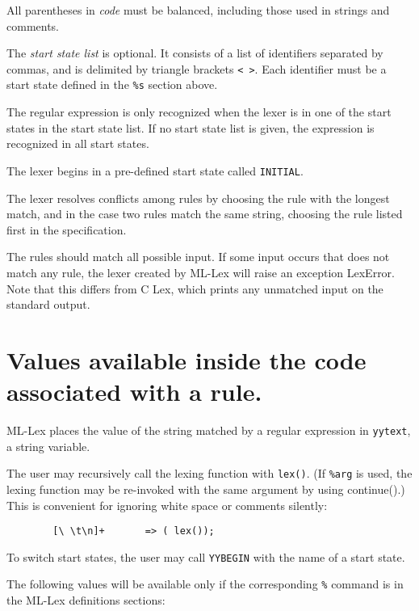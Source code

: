 All parentheses in  {\it code}  must be balanced, including those
used in strings and comments.

The {\it start state list} is optional.  It consists of a list of
identifiers separated by commas, and is delimited by triangle
brackets \verb|< >|.  Each identifier must be a start state defined in the
\verb|%s| section above.

The regular expression is only recognized when the lexer is in one of
the start states in the start state list.  If no start state list is
given, the expression is recognized in all start states.

The lexer begins in a pre-defined start state called \verb|INITIAL|.

The lexer resolves conflicts among rules by choosing the rule with
the longest match, and in the case two rules match the same string,
choosing the rule listed first in the specification.

The rules should match all possible input.  If some input occurs that
does not match any rule, the lexer created by ML-Lex will raise an
exception LexError.  Note that this differs from C Lex, which prints
any unmatched input on the standard output.

\section{Values available inside the code associated with a rule.}
\label{avail}

ML-Lex places the value of the string matched by a regular expression
in \verb|yytext|, a string variable.  

The user may recursively
call the lexing function with \verb|lex()|.  (If \verb|%arg| is used, the
lexing function may be re-invoked with the same argument by using
continue().) This is convenient for ignoring white space or comments silently:

\begin{verbatim}
        [\ \t\n]+       => ( lex());
\end{verbatim}

To switch start states, the user may call \verb|YYBEGIN| with the name of a
start state.

The following values will be available only if the corresponding \verb|%|
command is in the ML-Lex definitions sections:

